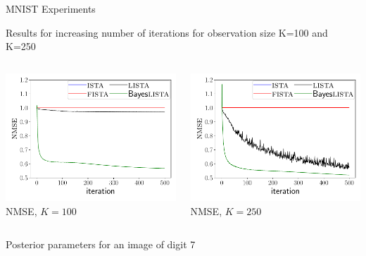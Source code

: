 \documentclass[9pt]{beamer}
\begin{document}
\begin{frame}{MNIST Experiments}
  \centering
  \begin{block}{Results for increasing number of iterations for observation size K=100 and K=250}
    \begin{columns}
      \begin{column}{0.33\textwidth}
        \centering
        \includegraphics[width=0.75\columnwidth]{graphics/mnist/100_nmse_valid.pdf} \\
        NMSE, $K=100$
      \end{column}
      \begin{column}{0.33\textwidth}
        \centering
        \includegraphics[width=0.75\columnwidth]{graphics/mnist/250_nmse_valid.pdf} \\
        NMSE, $K=250$
      \end{column}
    \end{columns}
  \end{block}
  \begin{block}{Posterior parameters for an image of digit 7}
    \begin{columns}

\end{columns}
\end{block}
\end{frame}
\end{document}
